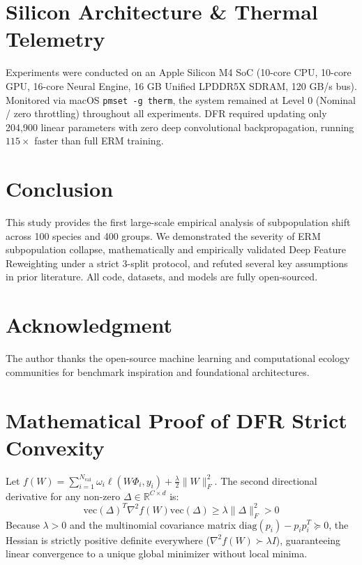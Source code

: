 \documentclass[10pt,journal,compsoc]{IEEEtran}
\begin{document}
\section{Silicon Architecture \& Thermal Telemetry}

Experiments were conducted on an Apple Silicon M4 SoC (10-core CPU, 10-core GPU, 16-core Neural Engine, 16 GB Unified LPDDR5X SDRAM, 120 GB/s bus). Monitored via macOS \texttt{pmset -g therm}, the system remained at Level 0 (Nominal / zero throttling) throughout all experiments. DFR required updating only 204,900 linear parameters with zero deep convolutional backpropagation, running $115\times$ faster than full ERM training.

\balance
\section{Conclusion}
This study provides the first large-scale empirical analysis of subpopulation shift across 100 species and 400 groups. We demonstrated the severity of ERM subpopulation collapse, mathematically and empirically validated Deep Feature Reweighting under a strict 3-split protocol, and refuted several key assumptions in prior literature. All code, datasets, and models are fully open-sourced.

\section*{Acknowledgment}
The author thanks the open-source machine learning and computational ecology communities for benchmark inspiration and foundational architectures.




\appendices

\section{Mathematical Proof of DFR Strict Convexity}
Let $f(W) = \sum_{i=1}^{N_{\text{val}}} \omega_i \ell(W \Phi_i, y_i) + \frac{\lambda}{2} \|W\|_F^2$. The second directional derivative for any non-zero $\Delta \in \mathbb{R}^{C \times d}$ is:
\begin{equation}
\text{vec}(\Delta)^T \nabla^2 f(W) \text{vec}(\Delta) \ge \lambda \|\Delta\|_F^2 > 0
\end{equation}
Because $\lambda > 0$ and the multinomial covariance matrix $\text{diag}(p_i) - p_i p_i^T \succeq 0$, the Hessian is strictly positive definite everywhere ($\nabla^2 f(W) \succ \lambda I$), guaranteeing linear convergence to a unique global minimizer without local minima.
\end{document}
